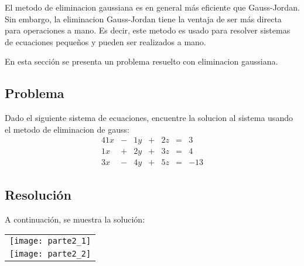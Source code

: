 \documentclass[a4paper,12pt]{article}
\begin{document}
El metodo de eliminacion gaussiana es en general más eficiente que Gauss-Jordan\cite{4}.
Sin embargo, la eliminacion Gauss-Jordan tiene la ventaja de ser más directa para
operaciones a mano. Es decir, este metodo es usado para resolver sistemas de ecuaciones 
pequeños y pueden ser realizados a mano.

En esta sección se presenta un problema resuelto con eliminacion gaussiana.

\subsection{Problema}
Dado el siguiente sistema de ecuaciones, encuentre la solucion al sistema usando 
el metodo de eliminacion de gauss:
\begin{alignat*}{4}
    1x & {}-{} &  1y & {}+{} & 2z & {}={} & 3 \\
    1x & {}+{} &  2y & {}+{}  & 3z & {}={} & 4 \\
    3x & {}-{} & 4y & {}+{}  & 5z & {}={} & -13
\end{alignat*}
\newpage
\subsection{Resolución}
A continuación, se muestra la solución:

\begin{table}[h]
    \centering
    \begin{tabular}{c}
        \begin{minipage}{15cm}
            \texttt{[image: parte2\_1]}
        \end{minipage}\\
        \begin{minipage}{15cm}
            \texttt{[image: parte2\_2]}
        \end{minipage}
    \end{tabular}
\end{table}
\end{document}
